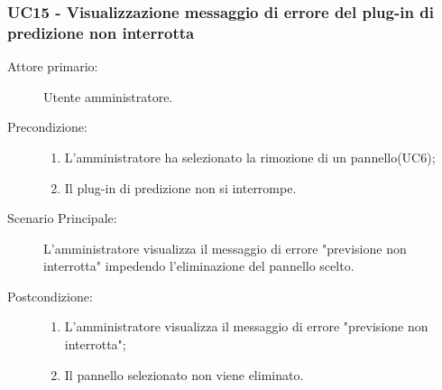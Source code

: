 \subsubsection{UC15 - Visualizzazione messaggio di errore del plug-in di predizione non interrotta}
\label{sssec:uc15}
\begin{description}
	\item[Attore primario:] Utente amministratore.
	\item[Precondizione:]
	\begin{enumerate}
		\item L'amministratore ha selezionato la rimozione di un pannello(UC6);
		\item Il plug-in di predizione non si interrompe.
	\end{enumerate}
	\item[Scenario Principale:] L'amministratore visualizza il messaggio di errore "previsione non interrotta" impedendo l'eliminazione del pannello scelto.
	\item[Postcondizione:]
	\begin{enumerate}
		\item L'amministratore visualizza il messaggio di errore "previsione non interrotta";
		\item Il pannello selezionato non viene eliminato.
	\end{enumerate}
\end{description}